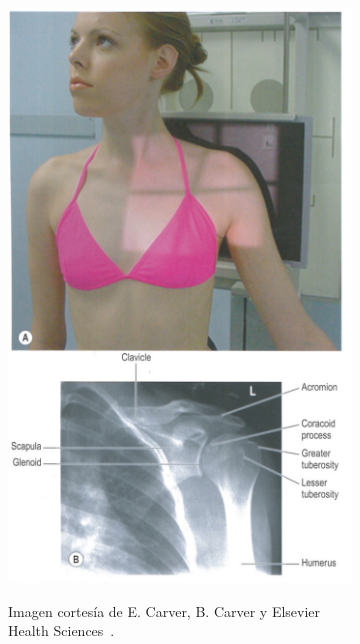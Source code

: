 \begin{figure}[ht]
    \begin{subfigure}[b]{0.45\linewidth}
        \centering
        {\includegraphics[width=\linewidth]{IMG/carvershoulder.PNG}}
        \caption{Imagen cortesía de E. Carver, B. Carver y Elsevier Health Sciences~\cite{carver2012medical}.}
    \end{subfigure}
    \null\hfill
     \begin{subfigure}[b]{0.45\linewidth}
        \centering

\end{subfigure}
\end{figure}
